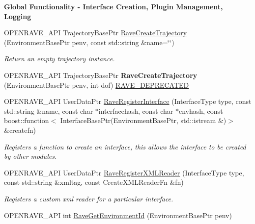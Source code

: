\begin{Indent}{\bf Global Functionality -\/ Interface Creation, Plugin Management, Logging}
\begin{DoxyCompactItemize}
\item 
\hypertarget{namespaceOpenRAVE_a32ad1afcac238cc161e67d72a461bf60}{
OPENRAVE\_\-API TrajectoryBasePtr \hyperlink{namespaceOpenRAVE_a32ad1afcac238cc161e67d72a461bf60}{RaveCreateTrajectory} (EnvironmentBasePtr penv, const std::string \&name=\char`\"{}\char`\"{})}
\label{namespaceOpenRAVE_a32ad1afcac238cc161e67d72a461bf60}

\begin{DoxyCompactList}\small\item\em Return an empty trajectory instance. \item\end{DoxyCompactList}\item 
\hypertarget{namespaceOpenRAVE_a43c761b0bcdc314f5fd6967df72169e8}{
OPENRAVE\_\-API TrajectoryBasePtr {\bfseries RaveCreateTrajectory} (EnvironmentBasePtr penv, int dof) \hyperlink{namespaceOpenRAVE_af23fc4c2c72950a8c02f38ef71680bc6}{RAVE\_\-DEPRECATED}}
\label{namespaceOpenRAVE_a43c761b0bcdc314f5fd6967df72169e8}

\item 
OPENRAVE\_\-API UserDataPtr \hyperlink{namespaceOpenRAVE_ad1ac80a7afacdb4a3a93086916eaa9e9}{RaveRegisterInterface} (InterfaceType type, const std::string \&name, const char $\ast$interfacehash, const char $\ast$envhash, const boost::function$<$ InterfaceBasePtr(EnvironmentBasePtr, std::istream \&)$>$ \&createfn)
\begin{DoxyCompactList}\small\item\em Registers a function to create an interface, this allows the interface to be created by other modules. \item\end{DoxyCompactList}\item 
OPENRAVE\_\-API UserDataPtr \hyperlink{namespaceOpenRAVE_a255c808782af449015333e7e230bf3b8}{RaveRegisterXMLReader} (InterfaceType type, const std::string \&xmltag, const CreateXMLReaderFn \&fn)
\begin{DoxyCompactList}\small\item\em Registers a custom xml reader for a particular interface. \item\end{DoxyCompactList}\item 
\hypertarget{namespaceOpenRAVE_aab71f332a1a87d00dbfaea9404034855}{
OPENRAVE\_\-API int \hyperlink{namespaceOpenRAVE_aab71f332a1a87d00dbfaea9404034855}{RaveGetEnvironmentId} (EnvironmentBasePtr penv)}
\label{namespaceOpenRAVE_aab71f332a1a87d00dbfaea9404034855}


\end{DoxyCompactItemize}
\end{Indent}
